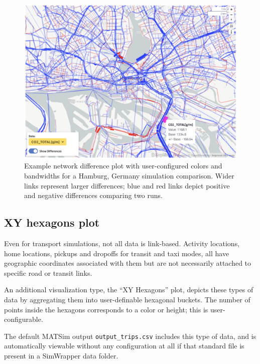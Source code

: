 \begin{figure}[ht]
  \centering
  \includegraphics[width=0.7\linewidth]{chapters/31-simwrapper/images/network-links.png}
  \caption{Example network difference plot with user-configured colors and bandwidths for a Hamburg, Germany simulation comparison. Wider links represent larger differences; blue and red links depict positive and negative differences comparing two runs. }
  \label{fig:simwrapper-network-links}
\end{figure}


\hypertarget{simwrapper-xy-hexagon-plots}{%
\subsection{XY hexagons plot}\label{simwrapper-xy-hexagon-plots}}

Even for transport simulations, not all data is link-based. Activity locations, home locations, pickups and dropoffs for transit and taxi modes, all have geographic coordinates associated with them but are not necessarily attached to specific road or transit links.

An additional visualization type, the ``XY Hexagons'' plot, depicts these types of data by aggregating them into user-definable hexagonal buckets. The number of points inside the hexagons corresponds to a color or height; this is user-configurable.

The default MATSim output \texttt{output\_trips.csv} includes this type of data, and is automatically viewable without any configuration at all if that standard file is present in a SimWrapper data folder.

